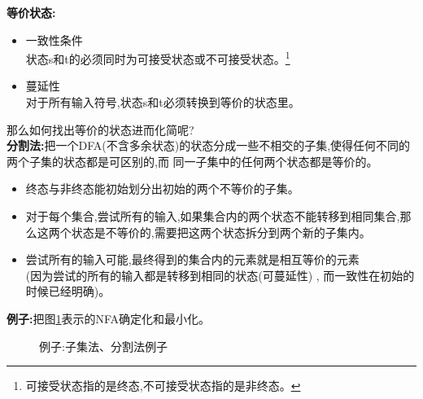 \documentclass[UTF8,a4paper]{ctexart}
\newcommand{\spaceline}{\vspace{\baselineskip}}
\begin{document}
  \spaceline
  \textbf{等价状态:}
  \begin{itemize}
    \item [(1)] 一致性条件\\
    状态s和t的必须同时为可接受状态或不可接受状态。\footnote{可接受状态指的是终态,不可接受状态指的是非终态。}
    \item [(2)] 蔓延性\\
    对于所有输入符号,状态s和t必须转换到等价的状态里。
  \end{itemize}

  \spaceline
  那么如何找出等价的状态进而化简呢?\\
  \textbf{分割法:}把一个DFA(不含多余状态)的状态分成一些不相交的子集,使得任何不同的两个子集的状态都是可区别的,而
  同一子集中的任何两个状态都是等价的。

  \begin{itemize}
    \item 终态与非终态能初始划分出初始的两个不等价的子集。
    \item 对于每个集合,尝试所有的输入,如果集合内的两个状态不能转移到相同集合,那么这两个状态是不等价的,需要把这两个状态拆分到两个新的子集内。
    \item 尝试所有的输入可能,最终得到的集合内的元素就是相互等价的元素\\
    (因为尝试的所有的输入都是转移到相同的状态(可蔓延性) , 而一致性在初始的时候已经明确)。
  \end{itemize}

  \spaceline
  \textbf{例子:}把图\ref{example-zijifafengefa}表示的NFA确定化和最小化。
  \begin{figure}[H]
    \centering
    \caption{例子:子集法、分割法例子}
    \label{example-zijifafengefa}
  \end{figure}
\end{document}
